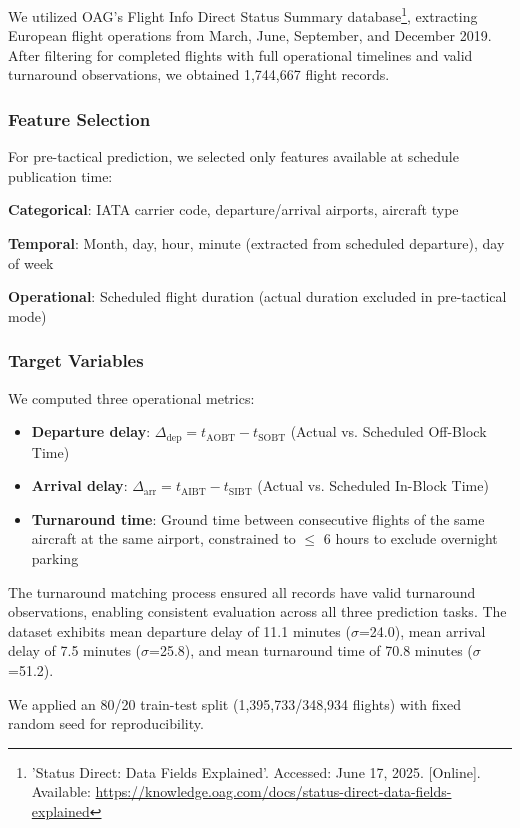 \documentclass[conference]{IEEEtran}
\begin{document}
We utilized OAG's Flight Info Direct Status Summary database\footnote{'Status Direct: Data Fields Explained'. Accessed: June 17, 2025. [Online]. Available: \url{https://knowledge.oag.com/docs/status-direct-data-fields-explained}}, extracting European flight operations from March, June, September, and December 2019. After filtering for completed flights with full operational timelines and valid turnaround observations, we obtained 1,744,667 flight records.

\subsubsection{Feature Selection}
For pre-tactical prediction, we selected only features available at schedule publication time:

\textbf{Categorical}: IATA carrier code, departure/arrival airports, aircraft type

\textbf{Temporal}: Month, day, hour, minute (extracted from scheduled departure), day of week

\textbf{Operational}: Scheduled flight duration (actual duration excluded in pre-tactical mode)

\subsubsection{Target Variables}
We computed three operational metrics:
\begin{itemize}
    \item \textbf{Departure delay}: $\Delta_{\text{dep}} = t_{\text{AOBT}} - t_{\text{SOBT}}$ (Actual vs. Scheduled Off-Block Time)
    \item \textbf{Arrival delay}: $\Delta_{\text{arr}} = t_{\text{AIBT}} - t_{\text{SIBT}}$ (Actual vs. Scheduled In-Block Time)
    \item \textbf{Turnaround time}: Ground time between consecutive flights of the same aircraft at the same airport, constrained to $\leq$ 6 hours to exclude overnight parking
\end{itemize}

The turnaround matching process ensured all records have valid turnaround observations, enabling consistent evaluation across all three prediction tasks. The dataset exhibits mean departure delay of 11.1 minutes ($\sigma$=24.0), mean arrival delay of 7.5 minutes ($\sigma$=25.8), and mean turnaround time of 70.8 minutes ($\sigma$=51.2).

We applied an 80/20 train-test split (1,395,733/348,934 flights) with fixed random seed for reproducibility.
\end{document}
